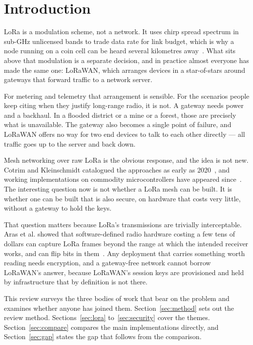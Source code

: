 \documentclass[conference]{IEEEtran}
\begin{document}
\section{Introduction}

LoRa is a modulation scheme, not a network. It uses chirp spread spectrum in
sub-GHz unlicensed bands to trade data rate for link budget, which is why a node
running on a coin cell can be heard several kilometres away~\cite{augustin2016lora}.
What sits above that modulation is a separate decision, and in practice almost
everyone has made the same one: LoRaWAN, which arranges devices in a
star-of-stars around gateways that forward traffic to a network server.

For metering and telemetry that arrangement is sensible. For the scenarios people
keep citing when they justify long-range radio, it is not. A gateway needs power
and a backhaul. In a flooded district or a mine or a forest, those are precisely
what is unavailable. The gateway also becomes a single point of failure, and
LoRaWAN offers no way for two end devices to talk to each other directly — all
traffic goes up to the server and back down.

Mesh networking over raw LoRa is the obvious response, and the idea is not new.
Cotrim and Kleinschmidt catalogued the approaches as early as
2020~\cite{cotrim2020lorawan}, and working implementations on commodity
microcontrollers have appeared since~\cite{sole2022loramesher}. The interesting
question now is not whether a LoRa mesh can be built. It is whether one can be
built that is also secure, on hardware that costs very little, without a gateway
to hold the keys.

That question matters because LoRa's transmissions are trivially interceptable.
Aras et al. showed that software-defined radio hardware costing a few tens of
dollars can capture LoRa frames beyond the range at which the intended receiver
works, and can flip bits in them~\cite{aras2017exploring}. Any deployment that
carries something worth reading needs encryption, and a gateway-free network
cannot borrow LoRaWAN's answer, because LoRaWAN's session keys are provisioned
and held by infrastructure that by definition is not there.

This review surveys the three bodies of work that bear on the problem and
examines whether anyone has joined them. Section~\ref{sec:method} sets out the
review method. Sections~\ref{sec:lora} to~\ref{sec:security} cover the themes.
Section~\ref{sec:compare} compares the main implementations directly, and
Section~\ref{sec:gap} states the gap that follows from the comparison.
\end{document}
